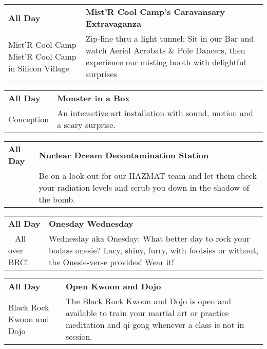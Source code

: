 \begin{tabular}{ p{1in} p{2.2in} }
    \textbf{All Day} & \textbf{Mist'R Cool Camp's Caravansary Extravaganza} \\
    Mist'R Cool Camp \newline Mist'R Cool Camp in Silicon Village & Zip-line thru a light tunnel; Sit in our Bar and watch Aerial Acrobats \& Pole Dancers, then experience our misting booth with delightful surprises \\
    \hline 
\end{tabular}
    
\begin{tabular}{ p{1in} p{2.2in} }
    \textbf{All Day} & \textbf{Monster in a Box} \\
    Conception \newline  & An interactive art installation with sound, motion and a scary surprise. \\
    \hline 
\end{tabular}
    
\begin{tabular}{ p{1in} p{2.2in} }
    \textbf{All Day} & \textbf{Nuclear Dream Decontamination Station} \\
    ~ \newline  & Be on a look out for our HAZMAT team and let them check your radiation levels and scrub you down in the shadow of the bomb. \\
    \hline 
\end{tabular}
    
\begin{tabular}{ p{1in} p{2.2in} }
    \textbf{All Day} & \textbf{Onesday Wednesday} \\
    ~ \newline All over BRC! & Wednesday aka Onesday: What better day to rock your badass onesie? Lacy, shiny, furry, with footsies or without, the Onesie-verse provides! Wear it! \\
    \hline 
\end{tabular}
    
\begin{tabular}{ p{1in} p{2.2in} }
    \textbf{All Day} & \textbf{Open Kwoon and Dojo} \\
    Black Rock Kwoon and Dojo \newline  & The Black Rock Kwoon and Dojo is open and available to train your martial art or practice meditation and qi gong whenever a class is not in session. \\
    \hline 
\end{tabular}
    
